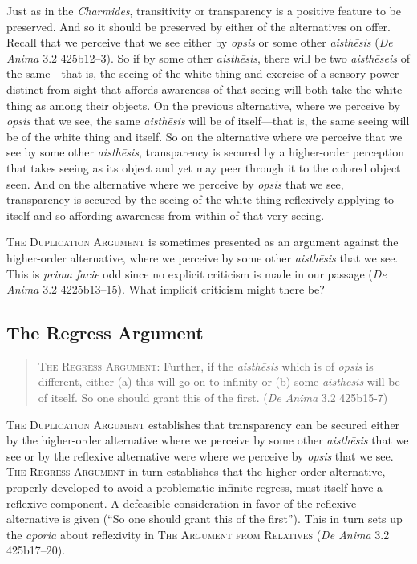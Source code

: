 Just as in the \emph{Charmides}, transitivity or transparency is a positive feature to be preserved. And so it should be preserved by either of the alternatives on offer. Recall that we perceive that we see either by \emph{opsis} or some other \emph{aisthēsis} (\emph{De Anima} 3.2 425b12–3). So if by some other \emph{aisthēsis}, there will be two \emph{aisthēseis} of the same—that is, the seeing of the white thing and exercise of a sensory power distinct from sight that affords awareness of that seeing will both take the white thing as among their objects. On the previous alternative, where we perceive by \emph{opsis} that we see, the same \emph{aisthēsis} will be of itself—that is, the same seeing will be of the white thing and itself. So on the alternative where we perceive that we see by some other \emph{aisthēsis}, transparency is secured by a higher-order perception that takes seeing as its object and yet may peer through it to the colored object seen. And on the alternative where we perceive by \emph{opsis} that we see, transparency is secured by the seeing of the white thing reflexively applying to itself and so affording awareness from within of that very seeing. 

\textsc{The Duplication Argument} is sometimes presented as an argument against the higher-order alternative, where we perceive by some other \emph{aisthēsis} that we see. This is \emph{prima facie} odd since no explicit criticism is made in our passage (\emph{De Anima} 3.2 4225b13–15). What implicit criticism might there be?


\subsection{The Regress Argument} %
\label{sub:the_regress_argument}

\begin{quote}
	\textsc{The Regress Argument}: Further, if the \emph{aisthēsis} which is of \emph{opsis} is different, either (a) this will go on to infinity or (b) some \emph{aisthēsis} will be of itself. So one should grant this of the first. (\emph{De Anima} 3.2 425b15-7)
\end{quote}

\textsc{The Duplication Argument} establishes that transparency can be secured either by the higher-order alternative where we perceive by some other \emph{aisthēsis} that we see or by the reflexive alternative were where we perceive by \emph{opsis} that we see. \textsc{The Regress Argument} in turn establishes that the higher-order alternative, properly developed to avoid a problematic infinite regress, must itself have a reflexive component. A defeasible consideration in favor of the reflexive alternative is given (``So one should grant this of the first''). This in turn sets up the \emph{aporia} about reflexivity in \textsc{The Argument from Relatives} (\emph{De Anima} 3.2 425b17–20).

